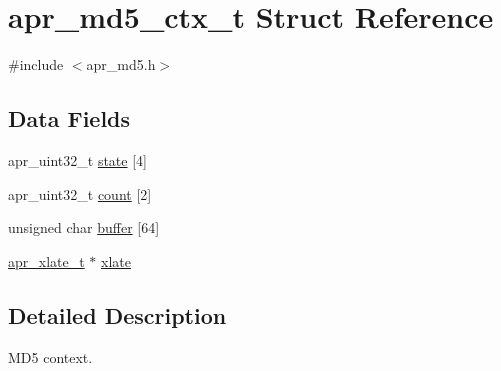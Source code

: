 \hypertarget{structapr__md5__ctx__t}{\section{apr\-\_\-md5\-\_\-ctx\-\_\-t Struct Reference}
\label{structapr__md5__ctx__t}
}


{\ttfamily \#include $<$apr\-\_\-md5.\-h$>$}

\subsection*{Data Fields}
\begin{DoxyCompactItemize}
\item 
apr\-\_\-uint32\-\_\-t \hyperlink{structapr__md5__ctx__t_ab8acbc6cd7a3dcd16e66e64a7f5357b5}{state} \mbox{[}4\mbox{]}
\item 
apr\-\_\-uint32\-\_\-t \hyperlink{structapr__md5__ctx__t_a3234a76e68a4ef546026a9854f9ba6d0}{count} \mbox{[}2\mbox{]}
\item 
unsigned char \hyperlink{structapr__md5__ctx__t_aed43a8aefc65c8973dbae804c94ad1e3}{buffer} \mbox{[}64\mbox{]}
\item 
\hyperlink{group___a_p_r___x_l_a_t_e_ga069dabbadc30e3a4157c38104a250e77}{apr\-\_\-xlate\-\_\-t} $\ast$ \hyperlink{structapr__md5__ctx__t_a391a62bc9e7fada71d03f786df4f49ba}{xlate}
\end{DoxyCompactItemize}


\subsection{Detailed Description}
M\-D5 context. 

